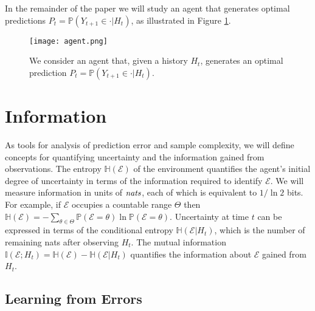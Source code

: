 \documentclass[twoside,11pt]{article}
\def\environment{\mathcal{E}}
\def\H{\mathbb{H}}
\def\I{\mathbb{I}}
\def\Pr{\mathbb{P}}
\begin{document}
In the remainder of the paper we will study an agent that generates optimal predictions $P_t = \Pr(Y_{t+1} \in \cdot | H_t)$, as illustrated in Figure \ref{fig:agent}.
\begin{figure}[!ht]
\centering
\texttt{[image: agent.png]}
\caption{We consider an agent that, given a history $H_t$, generates an optimal prediction $P_t = \Pr(Y_{t+1} \in \cdot | H_t)$.}
\label{fig:agent}
\end{figure}

\section{Information}

As tools for analysis of prediction error and sample complexity, we will define concepts for quantifying uncertainty and the information gained from observations.  The entropy $\H(\environment)$ of the environment quantifies the agent's initial degree of uncertainty in terms of the information required to identify $\environment$.  We will measure information in units of ${\it nats}$, each of which is equivalent to $1/\ln 2$ bits.  For example, if $\environment$ occupies a countable range $\Theta$ then $\H(\environment) = - \sum_{\theta \in \Theta} \Pr(\environment=\theta) \ln \Pr(\environment=\theta)$.  Uncertainty at time $t$ can be expressed in terms of the conditional entropy $\H(\environment|H_t)$, which is the number of remaining nats after observing $H_t$.  The mutual information $\I(\environment; H_t) = \H(\environment) - \H(\environment|H_t)$ quantifies the information about $\environment$ gained from $H_t$.

\subsection{Learning from Errors}
\end{document}
